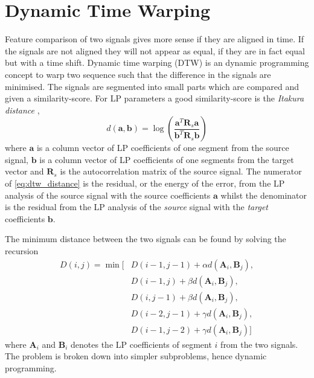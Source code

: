 \section{Dynamic Time Warping} %
\label{sec:dynamic_time_warping}
Feature comparison of two signals gives more sense if they are aligned in time. If the signals are not aligned they will not appear as equal, if they are in fact equal but with a time shift. Dynamic time warping (DTW) is an dynamic programming concept to warp two sequence such that the difference in the signals are minimised. The signals are segmented into small parts which are compared and given a similarity-score. For LP parameters a good similarity-score is the \emph{Itakura distance} \cite{itakura90},
\begin{equation}
	\label{eq:dtw_distance}
		d(\mathbf{a},\mathbf{b}) = \log\left(\frac{\mathbf{a}^T \mathbf{R}_s \mathbf{a}}{\mathbf{b}^T \mathbf{R}_s \mathbf{b}}\right)	
\end{equation}
where $\mathbf{a}$ is a column vector of LP coefficients of one segment from the source signal, $\mathbf{b}$ is a column vector of LP coefficients of one segments from the target vector and $\mathbf{R}_s$ is the autocorrelation matrix of the source signal. The numerator of \eqref{eq:dtw_distance} is the residual, or the energy of the error, from the LP analysis of the source signal with the source coefficients $\mathbf{a}$ whilst the denominator is the residual from the LP analysis of the \emph{source} signal with the \emph{target} coefficients $\mathbf{b}$. 

The minimum distance between the two signals can be found by solving the recursion \cite{taletek}
\begin{equation}
	\label{eq:dtw_recursion}
	\begin{split}
		D(i,j) = \min \bigl[&D(i-1,j-1)+\alpha d(\mathbf{A}_i,\mathbf{B}_j),\\
		& D(i-1,j)+\beta d(\mathbf{A}_i,\mathbf{B}_j),\\
		& D(i,j-1)+\beta d(\mathbf{A}_i,\mathbf{B}_j),\\
		& D(i-2,j-1)+\gamma d(\mathbf{A}_i,\mathbf{B}_j),\\
		& D(i-1,j-2)+\gamma d(\mathbf{A}_i,\mathbf{B}_j)\bigr]		
	\end{split}
\end{equation}
where $\mathbf{A}_i$ and $\mathbf{B}_i$ denotes the LP coefficients of segment $i$ from the two signals. 
The problem is broken down into simpler subproblems, hence dynamic programming. 

